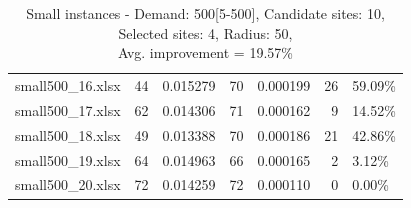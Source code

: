 \documentclass[11pt, a4paper]{article}
\begin{document}
\begin{table}[h!]
\begin{adjustbox}{max width=\textwidth}
\begin{tabular}{lrrrrrl}
	 small500\_16.xlsx &     44 &           0.015279 &      70 &           0.000199 &            26 &       59.09\% \\
	 small500\_17.xlsx &     62 &           0.014306 &      71 &           0.000162 &             9 &       14.52\% \\
	 small500\_18.xlsx &     49 &           0.013388 &      70 &           0.000186 &            21 &       42.86\% \\
	 small500\_19.xlsx &     64 &           0.014963 &      66 &           0.000165 &             2 &        3.12\% \\
	 small500\_20.xlsx &     72 &           0.014259 &      72 &           0.000110 &             0 &        0.00\% \\
	\bottomrule
	\end{tabular}	

\end{adjustbox}
\caption{Small instances - Demand: 500[5-500], Candidate sites: 10, Selected sites: 4, Radius: 50, \\ \centering Avg. improvement = 19.57\%}
\label{tab:small_instances}
\end{table}
\centering
\end{document}
